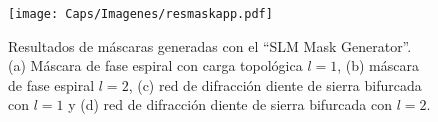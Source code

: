 \begin{figure}[!ht]
  \centering
	    \texttt{[image: Caps/Imagenes/resmaskapp.pdf]}
	\caption[Resultados de máscaras generadas con el ``SLM Mask Generator''.]{Resultados de máscaras generadas con el ``SLM Mask Generator''. (a) Máscara de fase espiral con carga topológica $l=1$, (b) máscara de fase espiral $l=2$, (c) red de difracción diente de sierra bifurcada con $l=1$ y (d) red de difracción diente de sierra bifurcada con $l=2$.}
	\label{fig:resmaskapp}
\end{figure}




